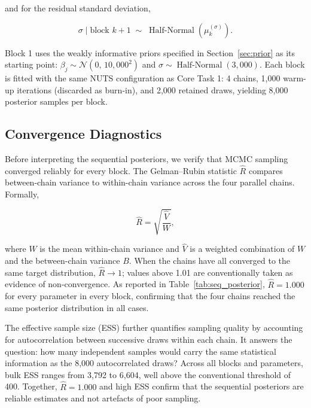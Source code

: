 \noindent and for the residual standard deviation,

\begin{equation}
    \sigma \mid \text{block } k+1 \;\sim\;
    \operatorname{Half-Normal}\!\left(\mu_k^{(\sigma)}\right).
    \label{eq:moment_match_sigma}
\end{equation}

Block 1 uses the weakly informative priors specified in Section~\ref{sec:prior}
as its starting point:
$\beta_j \sim \mathcal{N}(0,\,10{,}000^2)$ and
$\sigma \sim \operatorname{Half-Normal}(3{,}000)$.
Each block is fitted with the same NUTS configuration as Core Task 1: 4 chains,
1{,}000 warm-up iterations (discarded as burn-in), and 2{,}000 retained draws,
yielding 8{,}000 posterior samples per block.

\subsection{Convergence Diagnostics}

Before interpreting the sequential posteriors, we verify that MCMC sampling
converged reliably for every block. The Gelman--Rubin statistic $\hat{R}$ compares
between-chain variance to within-chain variance across the four parallel chains.
Formally,

\begin{equation}
    \hat{R} = \sqrt{\frac{\hat{V}}{W}},
\end{equation}

\noindent where $W$ is the mean within-chain variance and $\hat{V}$ is a
weighted combination of $W$ and the between-chain variance $B$. When the chains
have all converged to the same target distribution, $\hat{R} \to 1$; values
above 1.01 are conventionally taken as evidence of non-convergence. As reported
in Table~\ref{tab:seq_posterior}, $\hat{R} = 1.000$ for every parameter in
every block, confirming that the four chains reached the same posterior
distribution in all cases.

The effective sample size (ESS) further quantifies sampling quality by
accounting for autocorrelation between successive draws within each chain.
It answers the question: how many independent samples would carry the same
statistical information as the 8{,}000 autocorrelated draws? Across all blocks
and parameters, bulk ESS ranges from 3{,}792 to 6{,}604, well above the
conventional threshold of 400. Together, $\hat{R} = 1.000$ and high ESS
confirm that the sequential posteriors are reliable estimates and not artefacts
of poor sampling.


